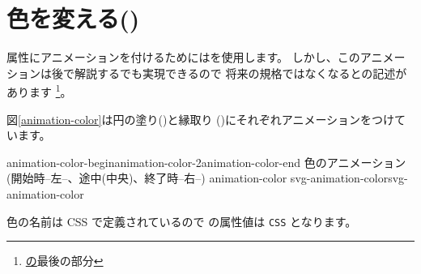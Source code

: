 \section{色を変える()}
属性にアニメーションを付けるためにはを使用します。
しかし、このアニメーションは後で解説するでも実現できるので
将来の規格ではなくなるとの記述があります
\footnote{\href{https://www.w3.org/TR/SVG/animate.html#AnimateColorElement}
の最後の部分}。

図\ref{animation-color}は円の塗り()と縁取り
()にそれぞれアニメーションをつけています。

{{animation-color-begin}{animation-color-2}{animation-color-end}}
{色のアニメーション(開始時--左--、途中(中央)、終了時--右--)}
{animation-color}
{svg-animation-color}{svg-animation-color}

色の名前は CSS で定義されているので  の属性値は
\texttt{CSS} となります。\vspace{-1.\baselineskip}
